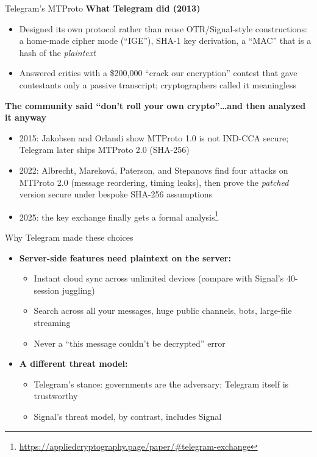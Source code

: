 \ifdefined\PRESENTATION\else\PassOptionsToClass{handout}{beamer}\fi\documentclass[aspectratio=169, lualatex]{beamer}
\begin{document}
\begin{frame}{Telegram's MTProto}
	\textbf{What Telegram did (2013)}
	\begin{itemize}
		\item Designed its own protocol rather than reuse OTR/Signal-style constructions: a home-made cipher mode (``IGE''), SHA-1 key derivation, a ``MAC'' that is a hash of the \textit{plaintext}
		\item Answered critics with a \$200,000 ``crack our encryption'' contest that gave contestants only a passive transcript; cryptographers called it meaningless
	\end{itemize}
	\textbf{The community said ``don't roll your own crypto''\ldots and then analyzed it anyway}
	\begin{itemize}
		\item 2015: Jakobsen and Orlandi show MTProto 1.0 is not IND-CCA secure; Telegram later ships MTProto 2.0 (SHA-256)
		\item 2022: Albrecht, Marekov\'a, Paterson, and Stepanovs find four attacks on MTProto 2.0 (message reordering, timing leaks), then prove the \textit{patched} version secure under bespoke SHA-256 assumptions
		\item 2025: the key exchange finally gets a formal analysis\footnote{\url{https://appliedcryptography.page/paper/\#telegram-exchange}}
	\end{itemize}
\end{frame}

\begin{frame}{Why Telegram made these choices}
	\begin{itemize}
		\item \textbf{Server-side features need plaintext on the server:}
		      \begin{itemize}
			      \item Instant cloud sync across unlimited devices (compare with Signal's 40-session juggling)
			      \item Search across all your messages, huge public channels, bots, large-file streaming
			      \item Never a ``this message couldn't be decrypted'' error
		      \end{itemize}
		\item \textbf{A different threat model:}
		      \begin{itemize}
			      \item Telegram's stance: governments are the adversary; Telegram itself is trustworthy
			      \item Signal's threat model, by contrast, includes Signal
		      \end{itemize}
	\end{itemize}
\end{frame}
\end{document}
